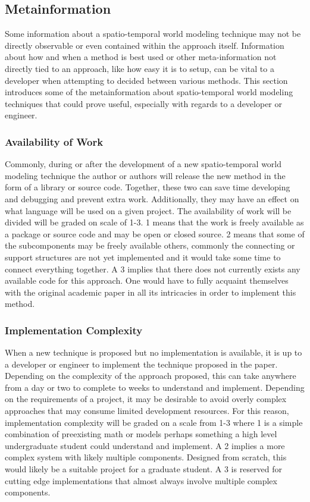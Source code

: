   \subsection{ Metainformation }

  Some information about a spatio-temporal world modeling technique may not be
  directly observable or even contained within the approach itself. Information
  about how and when a method is best used or other meta-information not directly
  tied to an approach, like how easy it is to setup, can be vital to a developer
  when attempting to decided between various methods. This section introduces
  some of the metainformation about spatio-temporal world modeling techniques
  that could prove useful, especially with regards to a developer or engineer.

  \subsubsection{ Availability of Work }
  Commonly, during or after the development of a new spatio-temporal world
  modeling technique the author or authors will release the new method in the
  form of a library or source code. Together, these two can save time developing
  and debugging and prevent extra work. Additionally, they may have an effect
  on what language will be used on a given project. The availability of work
  will be divided will be graded on scale of 1-3. 1 means that the work is
  freely available as a package or source code and may be open or closed source.
  2 means that some of the subcomponents may be freely available others,
  commonly the connecting or support structures are not yet implemented and it
  would take some time to connect everything together. A 3 implies that there
  does not currently exists any available code for this approach. One would have
  to fully acquaint themselves with the original academic paper in all its
  intricacies in order to implement this method.

  \subsubsection{ Implementation Complexity }
  When a new technique is proposed but no implementation is available, it is
  up to a developer or engineer to implement the technique proposed in the paper.
  Depending on the complexity of the approach proposed, this can take anywhere
  from a day or two to complete to weeks to understand and implement. Depending
  on the requirements of a project, it may be desirable to avoid overly complex
  approaches that may consume limited development resources. For this reason,
  implementation complexity will be graded on a scale from 1-3 where 1 is a
  simple combination of preexisting math or models perhaps something a high
  level undergraduate student could understand and implement. A 2 implies a
  more complex system with likely multiple components. Designed from scratch,
  this would likely be a suitable project for a graduate student. A 3 is reserved
  for cutting edge implementations that almost always involve multiple complex
  components.

